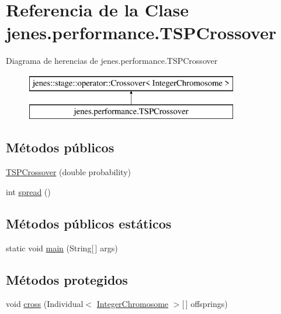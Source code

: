 \hypertarget{classjenes_1_1performance_1_1_t_s_p_crossover}{\section{Referencia de la Clase jenes.\-performance.\-T\-S\-P\-Crossover}
\label{classjenes_1_1performance_1_1_t_s_p_crossover}
}
Diagrama de herencias de jenes.\-performance.\-T\-S\-P\-Crossover\begin{figure}[H]
\begin{center}
\leavevmode
\includegraphics[height=2.000000cm]{classjenes_1_1performance_1_1_t_s_p_crossover}
\end{center}
\end{figure}
\subsection*{Métodos públicos}
\begin{DoxyCompactItemize}
\item 
\hyperlink{classjenes_1_1performance_1_1_t_s_p_crossover_a176bd2a0297786392cb4a8f5865cf97a}{T\-S\-P\-Crossover} (double probability)
\item 
int \hyperlink{classjenes_1_1performance_1_1_t_s_p_crossover_a08d867a3840e1c4ce0d9e57f5f21c839}{spread} ()
\end{DoxyCompactItemize}
\subsection*{Métodos públicos estáticos}
\begin{DoxyCompactItemize}
\item 
static void \hyperlink{classjenes_1_1performance_1_1_t_s_p_crossover_a13d3ceed0ac0f7ec8a8d428e511d5669}{main} (String\mbox{[}$\,$\mbox{]} args)
\end{DoxyCompactItemize}
\subsection*{Métodos protegidos}
\begin{DoxyCompactItemize}
\item 
void \hyperlink{classjenes_1_1performance_1_1_t_s_p_crossover_a8af2cecbf7cc09cd0836148d83f76fcf}{cross} (Individual$<$ \hyperlink{classjenes_1_1chromosome_1_1_integer_chromosome}{Integer\-Chromosome} $>$\mbox{[}$\,$\mbox{]} offsprings)
\end{DoxyCompactItemize}


